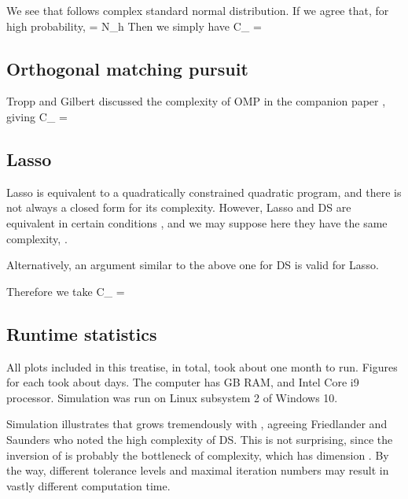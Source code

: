 We see that  follows complex standard normal distribution.
If we agree that, for high probability,
%
 {
 
= \s N_h   
}
Then we simply have
%
 {
C_{}
=  
}

\subsection {Orthogonal matching pursuit}

Tropp and Gilbert \cite {TrG07a} discussed the complexity of OMP in the companion paper \cite {TrG07b}, giving
%
 {
C_{}
=  
}

\subsection {Lasso}

Lasso is equivalent to a quadratically constrained quadratic program, and there is not always a closed form for its complexity.
However, Lasso and DS are equivalent in certain conditions \cite {AsR10}, and we may suppose here they have the same complexity, .

Alternatively, an argument similar to the above one for DS is valid for Lasso.

Therefore we take
 {
C_{}
= 
}

\subsection {Runtime statistics}

All plots included in this treatise, in total, took about one month to run.
Figures for  each took about  days.
The computer has  GB RAM, and Intel Core i9 processor.
Simulation was run on Linux subsystem 2 of Windows 10.

Simulation illustrates that  grows tremendously with , agreeing Friedlander and Saunders \cite {FrS07} who noted the high complexity of DS.
This is not surprising, since the inversion of  is probably the bottleneck of complexity, which has dimension .
By the way, different tolerance levels and maximal iteration numbers may result in vastly different computation time.

